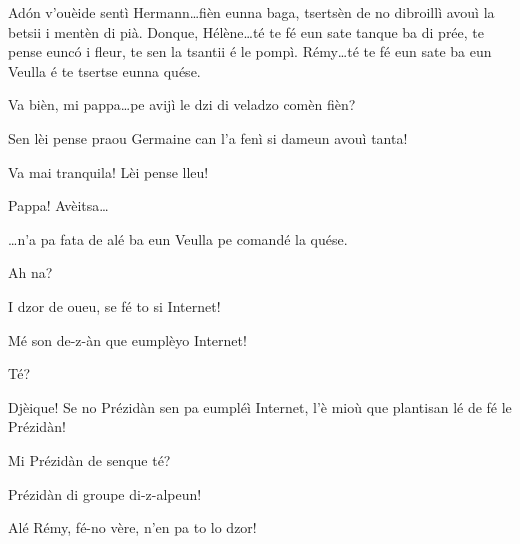 \begin{drama}

\Cesarspeaks{} Ad\'on v'ouèide sentì Hermann\ldots fièn eunna baga, tsertsèn de no dibroillì avouì la betsii i mentèn di pià. Donque, Hélène\ldots té te fé eun sate tanque ba di prée, te pense eunc\'o i fleur, te sen la tsantii é le pompì. Rémy\ldots té te fé eun sate ba eun Veulla é te tsertse eunna quése.


\Helenespeaks Va bièn, mi pappa\ldots pe avijì le dzi di veladzo comèn fièn?

\Cesarspeaks   Sen lèi pense praou Germaine  can l'a fenì si dameun avouì tanta!

\Battistaspeaks{} Va mai tranquila! Lèi pense lleu!




\Remyspeaks  Pappa! Avèitsa\ldots


\Remyspeaks \ldots n’a pa fata de alé ba 
eun Veulla pe comandé la quése.

\Cesarspeaks Ah na?

\Remyspeaks I dzor de oueu, se fé to si Internet! 

\Battistaspeaks{}  Mé son de-z-àn que eumplèyo Internet!

\Cesarspeaks{} Té?

\Cesarspeaks Djèique! Se no Prézidàn sen pa eumpléì Internet, l’è mioù que plantisan lé de fé le Prézidàn!

\Hermannspeaks Mi Prézidàn de senque té?

\Battistaspeaks  Prézidàn di groupe di-z-alpeun!


\Cesarspeaks Alé Rémy, fé-no vère, n'en pa to lo dzor! 



\end{drama}
